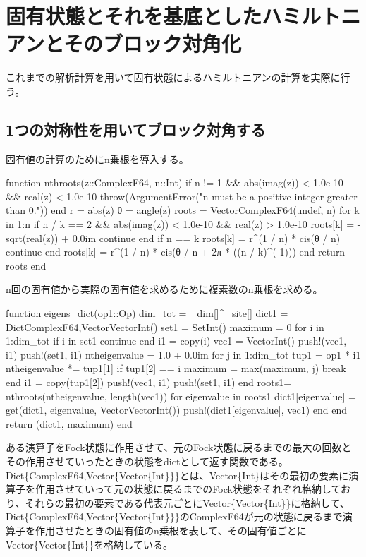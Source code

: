 \documentclass{ltjsarticle}
\begin{document}
\section{固有状態とそれを基底としたハミルトニアンとそのブロック対角化}
これまでの解析計算を用いて固有状態によるハミルトニアンの計算を実際に行う。
\subsection{1つの対称性を用いてブロック対角する}
固有値の計算のためにn乗根を導入する。
\begin{jllisting}
function nthroots(z::ComplexF64, n::Int)
  if n != 1 && abs(imag(z)) < 1.0e-10 && real(z) < 1.0e-10
    throw(ArgumentError("n must be a positive integer greater than 0."))
  end
    r = abs(z)
  θ = angle(z)
  roots = Vector{ComplexF64}(undef, n)
  for k in 1:n
    if n / k == 2 && abs(imag(z)) < 1.0e-10 && real(z) > 1.0e-10
      roots[k] = -sqrt(real(z)) + 0.0im
      continue
    end
    if n == k
      roots[k] = r^(1 / n) * cis(θ / n)
      continue
    end
    roots[k] = r^(1 / n) * cis(θ / n + 2π * ((n / k)^(-1)))
  end
  return roots
end
\end{jllisting}
n回の固有値から実際の固有値を求めるために複素数のn乗根を求める。\\
\begin{jllisting}
function eigens_dict(op1::Op)
  dim_tot = _dim[]^_site[]
  dict1 = Dict{ComplexF64,Vector{Vector{Int}}}()
  set1 = Set{Int}()
  maximum = 0
  for i in 1:dim_tot
    if i in set1
      continue
    end
    i1 = copy(i)
    vec1 = Vector{Int}()
    push!(vec1, i1)
    push!(set1, i1)
    ntheigenvalue = 1.0 + 0.0im
    for j in 1:dim_tot
      tup1 = op1 * i1
      ntheigenvalue *= tup1[1]
      if tup1[2] == i
        maximum = max(maximum, j)
        break
      end
      i1 = copy(tup1[2])
      push!(vec1, i1)
      push!(set1, i1)
    end
    roots1= nthroots(ntheigenvalue, length(vec1))
    for eigenvalue in roots1
      dict1[eigenvalue] = get(dict1, eigenvalue, Vector{Vector{Int}}())
      push!(dict1[eigenvalue], vec1)
    end
  end
  return (dict1, maximum)
end
\end{jllisting}
ある演算子をFock状態に作用させて、元のFock状態に戻るまでの最大の回数とその作用させていったときの状態をdictとして返す関数である。\\
Dict\{ComplexF64,Vector\{Vector\{Int\}\}\}とは、Vector\{Int\}はその最初の要素に演算子を作用させていって元の状態に戻るまでのFock状態をそれぞれ格納しており、それらの最初の要素である代表元ごとにVector\{Vector\{Int\}\}に格納して、Dict\{ComplexF64,Vector\{Vector\{Int\}\}\}のComplexF64が元の状態に戻るまで演算子を作用させたときの固有値のn乗根を表して、その固有値ごとにVector\{Vector\{Int\}\}を格納している。\\
\end{document}
